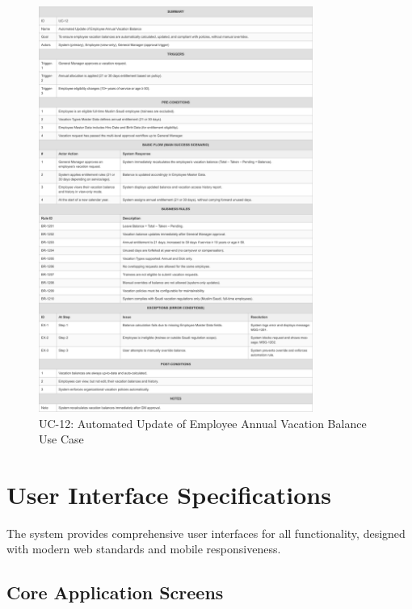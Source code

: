 \documentclass[12pt,a4paper]{article}
\begin{document}
\begin{figure}[H]
\centering
\includegraphics[width=0.8\textwidth]{Use-Cases/UC-12-Automated-Update-of-Employee-Annual-Vacation-Balance/UC-12-Automated-Update-of-Employee-Annual-Vacation-Balance-1.png}
\caption{UC-12: Automated Update of Employee Annual Vacation Balance Use Case}
\label{fig:uc12}
\end{figure}

\section{User Interface Specifications}

The system provides comprehensive user interfaces for all functionality, designed with modern web standards and mobile responsiveness.

\subsection{Core Application Screens}
\end{document}
